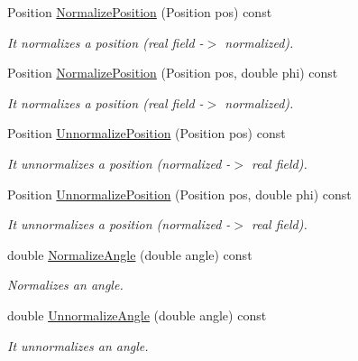 \begin{DoxyCompactItemize}
Position \hyperlink{classCoordinatesCalibrer_ad6519b69842756c256922d14d1e248ce}{NormalizePosition} (Position pos) const 
\begin{DoxyCompactList}\small\item\em It normalizes a position (real field -\/$>$ normalized). \item\end{DoxyCompactList}\item 
Position \hyperlink{classCoordinatesCalibrer_a034180f011c23565b9b5907ce0219fbf}{NormalizePosition} (Position pos, double phi) const 
\begin{DoxyCompactList}\small\item\em It normalizes a position (real field -\/$>$ normalized). \item\end{DoxyCompactList}\item 
Position \hyperlink{classCoordinatesCalibrer_a8522193b13196313d001c589e7845bd3}{UnnormalizePosition} (Position pos) const 
\begin{DoxyCompactList}\small\item\em It unnormalizes a position (normalized -\/$>$ real field). \item\end{DoxyCompactList}\item 
Position \hyperlink{classCoordinatesCalibrer_a19035a69d4d571e5e1d4baa4ba10baee}{UnnormalizePosition} (Position pos, double phi) const 
\begin{DoxyCompactList}\small\item\em It unnormalizes a position (normalized -\/$>$ real field). \item\end{DoxyCompactList}\item 
double \hyperlink{classCoordinatesCalibrer_acae6b5f07cf198f9c85a1b09e9a275dc}{NormalizeAngle} (double angle) const 
\begin{DoxyCompactList}\small\item\em Normalizes an angle. \item\end{DoxyCompactList}\item 
double \hyperlink{classCoordinatesCalibrer_ab97fd4d3f3930aaff39cee1543022cb6}{UnnormalizeAngle} (double angle) const 
\begin{DoxyCompactList}\small\item\em It unnormalizes an angle. \item\end{DoxyCompactList}\item 

\end{DoxyCompactItemize}
